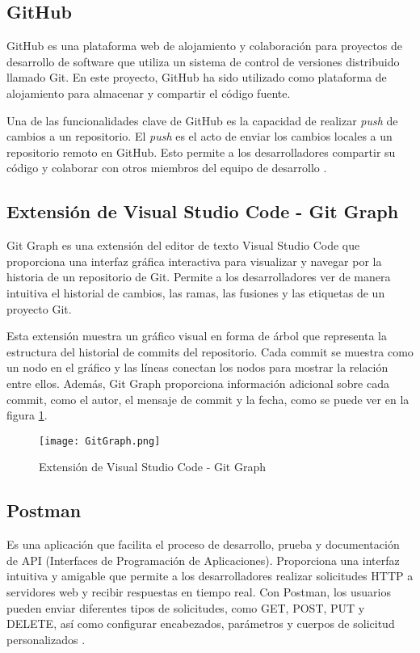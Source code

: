 \subsection{GitHub}
GitHub es una plataforma web de alojamiento y colaboración para proyectos de desarrollo de software que utiliza un sistema de control de versiones distribuido llamado Git. En este proyecto, GitHub ha sido utilizado como plataforma de alojamiento para almacenar y compartir el código fuente.

Una de las funcionalidades clave de GitHub es la capacidad de realizar \textit{push} de cambios a un repositorio. El \textit{push} es el acto de enviar los cambios locales a un repositorio remoto en GitHub. Esto permite a los desarrolladores compartir su código y colaborar con otros miembros del equipo de desarrollo \cite{10.1145/2675133.2675284}.
\subsection{Extensión de Visual Studio Code - Git Graph}
Git Graph es una extensión del editor de texto Visual Studio Code que proporciona una interfaz gráfica interactiva para visualizar y navegar por la historia de un repositorio de Git. Permite a los desarrolladores ver de manera intuitiva el historial de cambios, las ramas, las fusiones y las etiquetas de un proyecto Git.

Esta extensión muestra un gráfico visual en forma de árbol que representa la estructura del historial de commits del repositorio. Cada commit se muestra como un nodo en el gráfico y las líneas conectan los nodos para mostrar la relación entre ellos. Además, Git Graph proporciona información adicional sobre cada commit, como el autor, el mensaje de commit y la fecha, como se puede ver en la figura \ref{img:gitgraph}. 
\begin{figure}
  \centering
  \texttt{[image: GitGraph.png]}
  \caption{Extensión de Visual Studio Code - Git Graph}
  \label{img:gitgraph}
\end{figure}
\subsection{Postman}
Es una aplicación que facilita el proceso de desarrollo, prueba y documentación de API (Interfaces de Programación de Aplicaciones). Proporciona una interfaz intuitiva y amigable que permite a los desarrolladores realizar solicitudes HTTP a servidores web y recibir respuestas en tiempo real. Con Postman, los usuarios pueden enviar diferentes tipos de solicitudes, como GET, POST, PUT y DELETE, así como configurar encabezados, parámetros y cuerpos de solicitud personalizados \cite{Christudas2019}.
